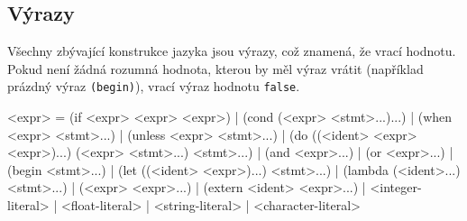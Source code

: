 \subsection{Výrazy}

Všechny zbývající konstrukce jazyka jsou výrazy, což znamená, že vrací hodnotu.
Pokud není žádná rozumná hodnota, kterou by měl výraz vrátit (například prázdný
výraz \texttt{(begin)}), vrací výraz hodnotu \texttt{false}.

\begin{gram}
<expr>        = (if <expr> <expr> <expr>)
              | (cond (<expr> <stmt>...)...)
              | (when <expr> <stmt>...)
              | (unless <expr> <stmt>...)
              | (do ((<ident> <expr> <expr>)...) (<expr> <stmt>...) <stmt>...)
              | (and <expr>...)
              | (or <expr>...)
              | (begin <stmt>...)
              | (let ((<ident> <expr>)...) <stmt>...)
              | (lambda (<ident>...) <stmt>...)
              | (<expr> <expr>...)
              | (extern <ident> <expr>...)
              | <integer-literal>
              | <float-literal>
              | <string-literal>
              | <character-literal>
\end{gram}

